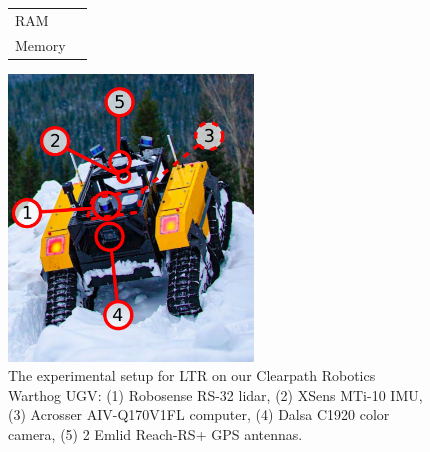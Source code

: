 \begin{figure} [h!]
\begin{minipage}[b]{1.0\linewidth}
\begin{tabular}[b]{l r}
			RAM                                                              \\
			Memory                                                           \\
			\bottomrule
		\end{tabular}
		\qquad
		\includegraphics[height=3in]{figs/warthog_hardware.pdf}
	\end{minipage}
	\caption{The experimental setup for \ac{LTR} on our Clearpath Robotics Warthog \ac{UGV}: (1) Robosense RS-32 lidar, (2) XSens MTi-10 \ac{IMU}, (3) Acrosser AIV-Q170V1FL computer, (4) Dalsa C1920 color camera, (5) 2 Emlid Reach-RS+ \ac{GPS} antennas. }
	\label{fig:warthog}
\end{figure}
